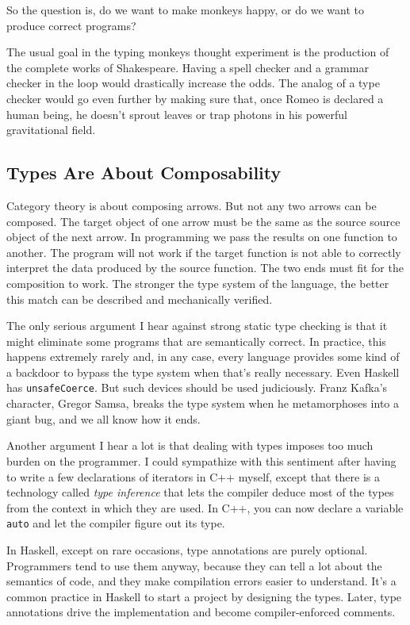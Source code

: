 So the question is, do we want to make monkeys happy, or do we want to
produce correct programs?

The usual goal in the typing monkeys thought experiment is the
production of the complete works of Shakespeare. Having a spell checker
and a grammar checker in the loop would drastically increase the odds.
The analog of a type checker would go even further by making sure that,
once Romeo is declared a human being, he doesn't sprout leaves or trap
photons in his powerful gravitational field.

\subsection{Types Are About
Composability}\label{types-are-about-composability}

Category theory is about composing arrows. But not any two arrows can be
composed. The target object of one arrow must be the same as the source
source object of the next arrow. In programming we pass the results on
one function to another. The program will not work if the target
function is not able to correctly interpret the data produced by the
source function. The two ends must fit for the composition to work. The
stronger the type system of the language, the better this match can be
described and mechanically verified.

The only serious argument I hear against strong static type checking is
that it might eliminate some programs that are semantically correct. In
practice, this happens extremely rarely and, in any case, every language
provides some kind of a backdoor to bypass the type system when that's
really necessary. Even Haskell has \texttt{unsafeCoerce}. But such
devices should be used judiciously. Franz Kafka's character, Gregor
Samsa, breaks the type system when he metamorphoses into a giant bug,
and we all know how it ends.

Another argument I hear a lot is that dealing with types imposes too
much burden on the programmer. I could sympathize with this sentiment
after having to write a few declarations of iterators in C++ myself,
except that there is a technology called \emph{type inference} that lets
the compiler deduce most of the types from the context in which they are
used. In C++, you can now declare a variable \texttt{auto} and let the
compiler figure out its type.

In Haskell, except on rare occasions, type annotations are purely
optional. Programmers tend to use them anyway, because they can tell a
lot about the semantics of code, and they make compilation errors easier
to understand. It's a common practice in Haskell to start a project by
designing the types. Later, type annotations drive the implementation
and become compiler-enforced comments.

